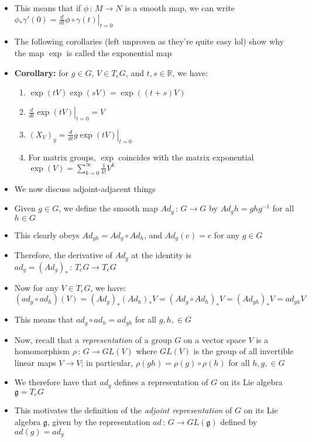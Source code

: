 \documentclass[12pt,a4paper]{article}
\numberwithin{equation}{section}
\begin{document}
\begin{itemize}
		\item This means that if $\phi\,:\,M\to N$ is a smooth map, we can write $\phi_{*}\gamma'(0)=\left.\frac{d}{dt}\phi\circ\gamma(t)\right\rvert_{t=0}$
		\item The following corollaries (left unproven as they're quite easy lol) show why the map $\exp$ is called the exponential map
		\item \textbf{Corollary:} for $g\in G$, $V\in T_{e}G$, and $t,s\in\mathbb{R}$, we have:
		\begin{enumerate}
			\item $\exp(tV)\exp(sV)=\exp((t+s)V)$
			\item $\left.\frac{d}{dt}\exp(tV)\right\rvert_{t=0}=V$
			\item $(X_{V})_{g}=\left.\frac{d}{dt}g\exp(tV)\right\rvert_{t=0}$
			\item For matrix groups, $\exp$ coincides with the matrix exponential $\exp(V)=\sum_{k=0}^{\infty}\frac{1}{k!}V^{k}$
		\end{enumerate}
		\item We now discuss adjoint-adjacent things
		\item Given $g\in G$, we define the smooth map $Ad_{g}\,:\,G\to G$ by $Ad_{g}h=ghg^{-1}$ for all $h\in G$
		\item This clearly obeys $Ad_{gh}=Ad_{g}\circ Ad_{h}$, and $Ad_{g}(e)=e$ for any $g\in G$
		\item Therefore, the derivative of $Ad_{g}$ at the identity is $ad_{g}=(Ad_{g})_{*}\,:\,T_{e}G\to T_{e}G$
		\item Now for any $V\in T_{e}G$, we have:
		\begin{equation}
			(ad_{g}\circ ad_{h})(V)=(Ad_{g})_{*}(Ad_{h})_{*}V=(Ad_{g}\circ Ad_{h})_{*}V=(Ad_{gh})_{*}V=ad_{gh}V
		\end{equation}
		\item This means that $ad_{g}\circ ad_{h}=ad_{gh}$ for all $g,h,\in G$
		\item Now, recall that a \textit{representation} of a group $G$ on a vector space $V$ is a homomorphism $\rho\,:\,G\to GL(V)$ where $GL(V)$ is the group of all invertible linear maps $V\to V$; in particular, $\rho(gh)=\rho(g)\circ\rho(h)$ for all $h,g,\in G$
		\item We therefore have that $ad_{g}$ defines a representation of $G$ on its Lie algebra $\mathfrak{g}=T_{e}G$
		\item This motivates the definition of the \textit{adjoint representation} of $G$ on its Lie algebra $\mathfrak{g}$, given by the representation $ad\,:\,G\to GL(\mathfrak{g})$ defined by $ad(g)=ad_{g}$

\end{itemize}
\end{document}
